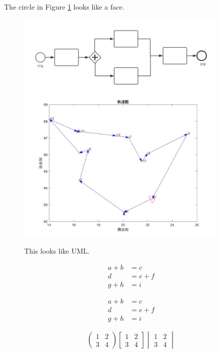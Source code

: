 \documentclass[12pt]{article}
\begin{document}
The circle in Figure \ref{meterial} looks like a face.
\begin{figure}
\centering
\includegraphics[width = 10cm]{meterial.png}
\includegraphics[width = 10cm]{graph.jpg}
\caption{This looks like UML.}
\label{meterial}
\end{figure}
\begin{align}
a + b &= c\\
	d &= e + f \nonumber\\
g + h &= i
\end{align}

\begin{align*}
a + b &= c\\
	d &= e + f \nonumber\\
g + h &= i
\end{align*}

\begin{equation*}
\begin{pmatrix}
1 & 2\\
3 & 4
\end{pmatrix}
\begin{bmatrix}
1 & 2\\
3 & 4
\end{bmatrix}
\begin{vmatrix}
1 & 2\\
3 & 4
\end{vmatrix}
\end{equation*}
\end{document}
